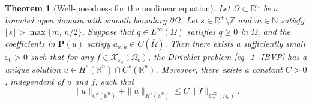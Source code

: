 \documentclass [oneside,11pt] {amsart}
\newcommand{\floor}[1]{\lfloor #1 \rfloor}
\numberwithin{equation}{section}
\newtheorem{theorem}{Theorem}[section]
\newcommand{\R}{\mathbb{R}}
\newcommand{\p}{\partial}
\begin{document}
\begin{theorem}[Well-posedness for the nonlinear equation]
\label{thm_wellposdness}
Let $\Omega\subset\R^n$ be a bounded open domain with smooth 
boundary $\p\Omega$. Let $s\in \R^+\setminus \mathbb{Z}$ and $m\in \mathbb{N}$ satisfy $\floor{s}>\max\{m,\,n/2\}$.
Suppose that $q\in L^\infty(\Omega)$ satisfies $q\geq 0$ in $\Omega$, and the coefficients in $\mathbf{P}(u)$ satisfy $a_{\sigma,k}\in C (\overline\Omega)$.  
Then there exists a sufficiently small $\varepsilon_0>0$ such that for any $f\in \mathcal{X}_{\varepsilon_0}(\Omega_e)$,
the Dirichlet problem \eqref{eq_1_IBVP} has a unique solution $u\in H^s(\R^n)\cap C^s(\R^n)$. Moreover, there exists a constant $C>0$, independent of $u$ and $f$, such that  
\[
\|u\|_{C^{s}(\R^n)}+ \|u\|_{H^{s}(\R^n)}\le C\|f\|_{C^\infty_c(\Omega_e)}.
\]
\end{theorem}
\end{document}
